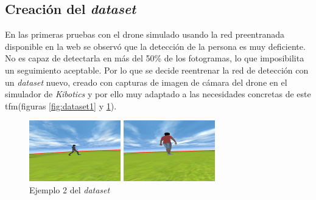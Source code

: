 \subsection*{Creación del \textit{dataset}}
En las primeras pruebas con el drone simulado usando la red preentranada disponible en la web se observó que la detección de la persona es muy deficiente. No es capaz de detectarla en más del 50\% de los fotogramas, lo que imposibilita un seguimiento aceptable. Por lo que se decide reentrenar la red de detección con un \textit{dataset} nuevo, creado con capturas de imagen de cámara del drone \cite{github_dataset} en el simulador de \textit{Kibotics} y por ello muy adaptado a las necesidades concretas de este \acrshort{tfm}(figuras \ref{fig:dataset1} y \ref{fig:dataset2}).
\begin{figure}[!htb]
    \includegraphics[width=\linewidth]{figures/simulado/person157.jpg}
    \caption{Ejemplo 1 del \textit{dataset}}\label{fig:dataset1}
\endminipage\hfill
{}
    \includegraphics[width=\linewidth]{figures/simulado/person227.jpg}
    \caption{Ejemplo 2 del \textit{dataset}}\label{fig:dataset2}
\endminipage\hfill
\end{figure}

